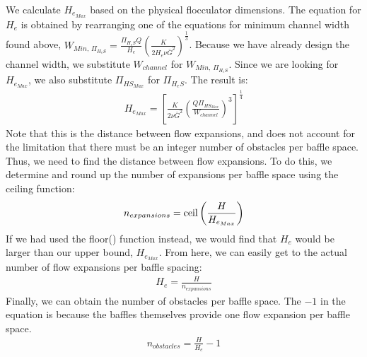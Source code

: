 \documentclass[letterpaper,10pt,english]{sphinxmanual}
\begin{document}
We calculate \(H_{e_{Max}}\) based on the physical flocculator dimensions. The equation for \(H_e\) is obtained by rearranging one of the equations for minimum channel width found above, \(W_{Min, \, \Pi_{H_eS}} = \frac{\Pi_{H_eS}Q}{H_e}\left( \frac{K}{2 H_e \nu \bar G^2} \right)^\frac{1}{3}\). Because we have already design the channel width, we substitute \(W_{channel}\) for \(W_{Min, \, \Pi_{H_eS}}\). Since we are looking for \(H_{e_{Max}}\), we also substitute \(\Pi_{{HS}_{Max}}\) for \(\Pi_{H_eS}\). The result is:
\begin{equation}\label{equation:Flocculation/Floc_Design:Flocculation/Floc_Design:25}
\begin{split}H_{e_{Max}} = \left[ \frac{K}{2 \nu \bar G^2} \left( \frac{Q \Pi_{{HS}_{Max}}}{W_{channel}} \right)^3 \right]^\frac{1}{4}\end{split}
\end{equation}
Note that this is the  distance between flow expansions, and does not account for the limitation that there must be an integer number of obstacles per baffle space. Thus, we need to find the  distance between flow expansions. To do this, we determine and round up the number of expansions per baffle space using the ceiling function:
\begin{equation}\label{equation:Flocculation/Floc_Design:Flocculation/Floc_Design:26}
\begin{split}n_{expansions} = {\rm ceil}\left( \frac{H}{H_{e_{Max}}} \right)\end{split}
\end{equation}
If we had used the floor() function instead, we would find that \(H_e\) would be larger than our upper bound, \(H_{e_{Max}}\). From here, we can easily get to the actual number of flow expansions per baffle spacing:
\begin{equation}\label{equation:Flocculation/Floc_Design:Flocculation/Floc_Design:27}
\begin{split}H_e = \frac{H}{n_{expansions}}\end{split}
\end{equation}
Finally, we can obtain the number of obstacles per baffle space. The \(- 1\) in the equation is because the baffles themselves provide one flow expansion per baffle space.
\begin{equation}\label{equation:Flocculation/Floc_Design:Flocculation/Floc_Design:28}
\begin{split}n_{obstacles} = \frac{H}{H_e} - 1\end{split}
\end{equation}
\end{document}
